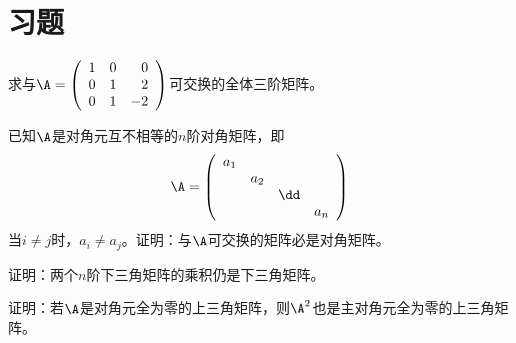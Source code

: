 \section{习题}

\begin{frame}
  \begin{footnotesize}
    \begin{exampleblock}{28}
      求与$\A=\left(
      \begin{array}{rrr}
        1&0&0\\
        0&1&2\\
        0&1&-2
      \end{array}
      \right)$可交换的全体三阶矩阵。
    \end{exampleblock}
  \end{footnotesize}
\end{frame}



\begin{frame}
  \begin{footnotesize}
    \begin{exampleblock}{29}
      已知$\A$是对角元互不相等的$n$阶对角矩阵，即
      $$
      \A=\left(
      \begin{array}{cccc}
        a_1&&&\\
        &a_2&&\\
        &&\dd&\\
        &&&a_n
      \end{array}
      \right)
      $$
      当$i\ne j$时，$a_i\ne a_j$。证明：与$\A$可交换的矩阵必是对角矩阵。
    \end{exampleblock}
  \end{footnotesize}
\end{frame}



\begin{frame}
  \begin{footnotesize}
    \begin{exampleblock}{30}
      证明：两个$n$阶下三角矩阵的乘积仍是下三角矩阵。
    \end{exampleblock}
  \end{footnotesize}
\end{frame}



\begin{frame}
  \begin{footnotesize}
    \begin{exampleblock}{31}
      证明：若$\A$是对角元全为零的上三角矩阵，则$\A^2$也是主对角元全为零的上三角矩阵。
    \end{exampleblock}
  \end{footnotesize}
\end{frame}



